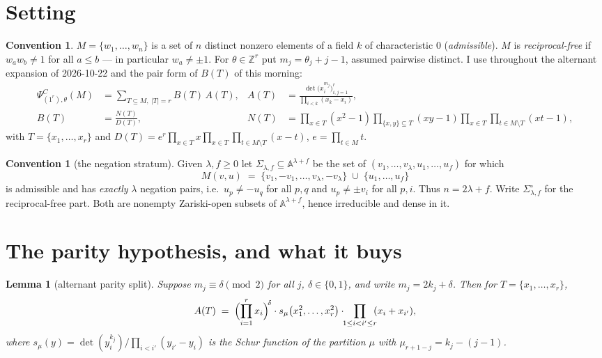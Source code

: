 \documentclass[11pt]{article}
\newtheorem{lemma}[theorem]{Lemma}
\theoremstyle{definition}
\newtheorem{convention}[theorem]{Convention}
\theoremstyle{remark}
\newcommand{\PsiC}{\Psi^{C}}
\newcommand{\ZZ}{\mathbb{Z}}
\newcommand{\bftheta}{\theta}
\begin{document}
\section{Setting}

\begin{convention}\label{conv:setup}
$M=\{w_1,\dots,w_n\}$ is a set of $n$ distinct nonzero elements of a field $k$ of
characteristic $0$ (\emph{admissible}). $M$ is \emph{reciprocal-free} if
$w_aw_b\neq1$ for all $a\le b$ --- in particular $w_a\neq\pm1$. For
$\bftheta\in\ZZ^r$ put $m_j=\theta_j+j-1$, assumed pairwise distinct. I use throughout
the alternant expansion of 2026-10-22 and the pair form of $B(T)$ of this morning:
\begin{align}
  \PsiC_{(1^r),\bftheta}(M) &= \sum_{T\subseteq M,\ |T|=r} B(T)\,A(T),
  &A(T)&=\frac{\det\bigl(x_i^{m_j}\bigr)_{i,j=1}^{r}}{\prod_{i<k}(x_k-x_i)},
  \label{eq:alt}\\
  B(T)&=\frac{N(T)}{D(T)},
  &N(T)&=\prod_{x\in T}(x^2-1)\!\!\prod_{\{x,y\}\subseteq T}\!\!(xy-1)
          \prod_{x\in T}\prod_{t\in M\setminus T}\!\!(xt-1),
  \label{eq:pairform}
\end{align}
with $T=\{x_1,\dots,x_r\}$ and
$D(T)=e^{r}\prod_{x\in T}x\prod_{x\in T}\prod_{t\in M\setminus T}(x-t)$, $e=\prod_{t\in M}t$.
\end{convention}

\begin{convention}[the negation stratum]\label{conv:stratum}
Given $\lambda,f\ge0$ let $\Sigma_{\lambda,f}\subseteq\mathbb{A}^{\lambda+f}$ be the set
of $(v_1,\dots,v_\lambda,u_1,\dots,u_f)$ for which
\[
  M(v,u)\;=\;\{v_1,-v_1,\dots,v_\lambda,-v_\lambda\}\;\cup\;\{u_1,\dots,u_f\}
\]
is admissible and has \emph{exactly} $\lambda$ negation pairs, i.e.\ $u_p\neq-u_q$ for
all $p,q$ and $u_p\neq\pm v_i$ for all $p,i$. Thus $n=2\lambda+f$. Write
$\Sigma^{\circ}_{\lambda,f}$ for the reciprocal-free part. Both are nonempty Zariski-open
subsets of $\mathbb{A}^{\lambda+f}$, hence irreducible and dense in it.
\end{convention}

\section{The parity hypothesis, and what it buys}

\begin{lemma}[alternant parity split]\label{lem:parity}
Suppose $m_j\equiv\delta\pmod2$ for all $j$, $\delta\in\{0,1\}$, and write
$m_j=2k_j+\delta$. Then for $T=\{x_1,\dots,x_r\}$,
\[
  A(T)\;=\;\Bigl(\prod_{i=1}^{r}x_i\Bigr)^{\!\delta}\cdot
           s_\mu\bigl(x_1^2,\dots,x_r^2\bigr)\cdot\!\!\prod_{1\le i<i'\le r}\!\!(x_i+x_{i'}),
\]
where $s_\mu(y)=\det(y_i^{k_j})/\prod_{i<i'}(y_{i'}-y_i)$ is the Schur function of the
partition $\mu$ with $\mu_{r+1-j}=k_j-(j-1)$.
\end{lemma}
\end{document}
